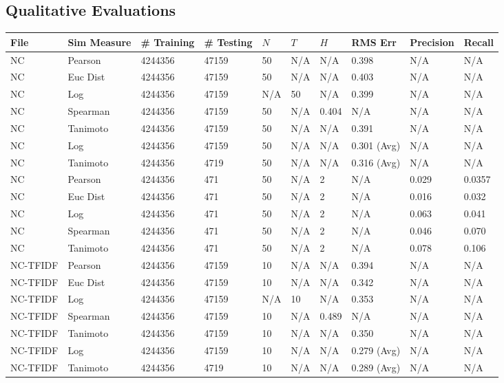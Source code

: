 \documentclass{article}
\begin{document}
\subsection{Qualitative Evaluations}\label{sec:qualitative-evaluations}

\begin{longtable}{ |p{1.7cm}|p{1.9cm}|p{1.5cm}|p{1.5cm}|p{0.75cm}|p{0.75cm}|p{0.75cm}|p{0.75cm}|p{1.5cm}|p{1.5cm}|}
    \hline
    File & Sim Measure & \# Training & \# Testing & $N$ & $T$ & $H$ & RMS Err & Precision & Recall \\ \hline\hline
    NC & Pearson & 4244356 & 47159 & 50 & N/A & N/A & 0.398 & N/A & N/A  \\ \hline
    NC  & Euc Dist & 4244356 & 47159 & 50 & N/A & N/A & 0.403 & N/A & N/A   \\ \hline
    NC  & Log & 4244356 & 47159  & N/A &  50 & N/A& 0.399 & N/A & N/A  \\ \hline
    NC  & Spearman & 4244356 & 47159  & 50 & N/A & 0.404 & N/A & N/A & N/A \\ \hline
    NC  & Tanimoto & 4244356 & 47159 & 50 & N/A& N/A & 0.391 & N/A & N/A \\ \hline
    NC  & Log & 4244356 & 47159 & 50 & N/A& N/A & 0.301 (Avg) & N/A & N/A \\ \hline
    NC  & Tanimoto & 4244356 & 4719 & 50 & N/A & N/A & 0.316 (Avg) & N/A & N/A \\ \hline
    
    NC  & Pearson & 4244356 & 471 & 50 & N/A  & 2 & N/A & 0.029 & 0.0357  \\ \hline
    NC  & Euc Dist & 4244356 & 471 & 50 & N/A  & 2 & N/A & 0.016 & 0.032   \\ \hline
    NC  & Log & 4244356 & 471& 50 & N/A & 2 & N/A & 0.063 & 0.041  \\ \hline
    NC  & Spearman & 4244356 & 471 & 50 & N/A  & 2 & N/A &0.046 & 0.070 \\ \hline
    NC  & Tanimoto & 4244356 & 471 & 50 & N/A  & 2 & N/A & 0.078 & 0.106 \\ \hline
    
    NC-TFIDF & Pearson & 4244356 & 47159 & 10 & N/A & N/A & 0.394 & N/A & N/A  \\ \hline
    NC-TFIDF  & Euc Dist & 4244356 & 47159 & 10 & N/A & N/A & 0.342 & N/A & N/A   \\ \hline
    NC-TFIDF  & Log & 4244356 & 47159  & N/A &  10 & N/A& 0.353 & N/A & N/A  \\ \hline
    NC-TFIDF  & Spearman & 4244356 & 47159  & 10 & N/A & 0.489 & N/A & N/A & N/A \\ \hline
    NC-TFIDF  & Tanimoto & 4244356 & 47159 & 10 & N/A& N/A & 0.350 & N/A & N/A \\ \hline
    NC-TFIDF  & Log & 4244356 & 47159 & 10 & N/A& N/A & 0.279 (Avg) & N/A & N/A \\ \hline
    NC-TFIDF  & Tanimoto & 4244356 & 4719 & 10 & N/A & N/A & 0.289 (Avg) & N/A & N/A \\ \hline
    

\end{longtable}
\end{document}
